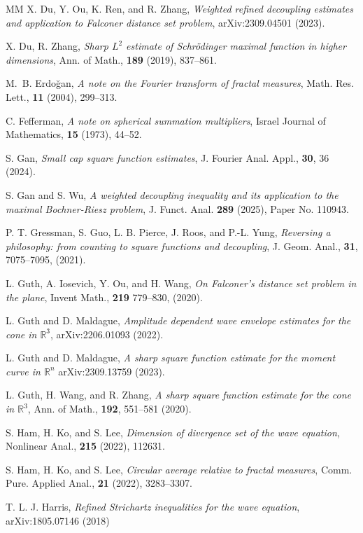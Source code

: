 \documentclass[11pt]{amsart}
\theoremstyle{definition}
\theoremstyle{remark}
\newcommand{\R}{\mathbb{R}}
\begin{document}
\begin{thebibliography}{MM}
 X. Du, Y. Ou, K. Ren, and R. Zhang,
\textit{Weighted refined decoupling estimates and application to Falconer distance set problem},
arXiv:2309.04501 (2023).

 X. Du, R. Zhang, 
\textit{Sharp $L^2$ estimate of Schr\"{o}dinger maximal function in higher dimensions}, 
Ann. of Math., \textbf{189} (2019), 837--861.

 M.~B. Erdo\u gan, 
\textit{A note on the Fourier transform of fractal measures},
Math. Res. Lett., {\bf 11} (2004), 299--313.

 C. Fefferman, 
\textit{A note on spherical summation multipliers},
Israel Journal of Mathematics, \textbf{15} (1973), 44--52.

 S. Gan, 
\textit{Small cap square function estimates}, 
J. Fourier Anal. Appl., \textbf{30}, 36 (2024).

 S. Gan and S. Wu, 
\textit{A weighted decoupling inequality and its application to the maximal Bochner-Riesz problem}, 
J. Funct. Anal. {\bf 289} (2025), Paper No. 110943.

 P. T. Gressman, S. Guo, L. B. Pierce, J. Roos, and P.-L. Yung,
\textit{Reversing a philosophy: from counting to square functions and decoupling}, 
J. Geom. Anal., \textbf{31}, 7075--7095, (2021).
 
 L. Guth, A. Iosevich, Y. Ou, and H. Wang,
\textit{On Falconer’s distance set problem in the plane},
Invent Math., \textbf{219} 779--830, (2020).

 L. Guth and D. Maldague,
\textit{Amplitude dependent wave envelope estimates for the cone in $\R^3$}, 
arXiv:2206.01093 (2022).

 L. Guth and D. Maldague,
\textit{A sharp square function estimate for the moment curve in $\R^n$}
arXiv:2309.13759 (2023).

 L. Guth, H. Wang, and R. Zhang,
\textit{A sharp square function estimate for the cone in $\R^3$},
Ann. of Math., \textbf{192}, 551--581 (2020).

 S. Ham, H. Ko, and S. Lee,
\textit{Dimension of divergence set of the wave equation},
Nonlinear Anal., \textbf{215} (2022), 112631.

 S. Ham, H. Ko, and S. Lee,
\textit{Circular average relative to fractal measures},
Comm. Pure. Applied Anal., \textbf{21} (2022), 3283--3307.

 T. L. J. Harris,
\textit{Refined Strichartz inequalities for the wave equation},
arXiv:1805.07146 (2018)


\end{thebibliography}
\end{document}
